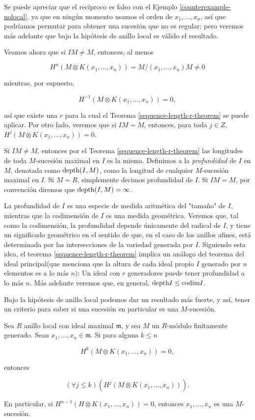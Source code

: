 Se puede apreciar que el recíproco es falso con el Ejemplo \ref{counterexample-nolocal}, ya que en ningún momento usamos el orden de $x_1,\dots, x_n$, así que podríamos permutar para obtener una sucesión que no es regular; pero veremos más adelante que bajo la hipótesis de anillo local es válido el resultado.

Veamos ahora que si $IM \neq M$, entonces, al menos

$$H^n(M\otimes K(x_1,\dots,x_n)) = M/(x_1,\dots,x_n)M \neq 0$$

mientras, por supuesto,

$$ H^{-1}(M\otimes K(x_1,\dots,x_n)) = 0,$$

así que existe una $r$ para la cual el Teorema \ref{sequence-length-r-theorem} se puede aplicar. Por otro lado, veremos que si $IM = M$, entonces, para toda $j \in Z$, $H^j(M\otimes K(x_1,\dots,x_n)) = 0$.

Si $IM \neq M$, entonces por el Teorema \ref{sequence-length-r-theorem} las longitudes de toda $M$-sucesión maximal en $I$ es la misma. Definimos a la \emph{profundidad} de $I$ en $M$, denotada como $\textrm{depth}(I,M)$, como la longitud de cualquier $M$-sucesión maximal en $I$. Si $M = R$, simplemente decimos profundidad de $I$. Si $IM = M$, por convención diremos que $\textrm{depth}(I,M) = \infty$.

La profundidad de $I$ es una especie de medida aritmética del "tamaño" de $I$, mientras que la codimensión de $I$ es una medida geométrica. Veremos que, tal como la codimensión, la profundidad depende únicamente del radical de $I$, y tiene un significado geométrico en el sentido de que, en el caso de los anillos afines, está determinada por las intersecciones de la variedad generada por $I$. Siguiendo esta idea, el teorema \ref{sequence-length-r-theorem} implica un análogo del teorema del ideal principal(que menciona que la altura de cada ideal propio $I$ generado por $n$ elementos es a lo más $n$): Un ideal con $r$ generadores puede tener profundidad a lo más $n$. Más adelante veremos que, en general, $\textrm{depth} I \leq \textrm{codim} I$.

Bajo la hipótesis de anillo local podemos dar un resultado más fuerte, y así, tener un criterio para saber si una sucesión en particular es una $M$-sucesión.

\begin{theorem}\label{sequence-criterion-regular}
Sea $R$ anillo local con ideal maximal $\mathfrak{m}$, y sea $M$ un $R$-módulo finitamente generado. Sean $x_1,\dots,x_n\in\mathfrak{m}$. Si para alguna $k \leq n$

$$ H^k(M \otimes K(x_1,\dots,x_n)) = 0, $$

entonces 

$$ (\forall j \leq k)(H^j(M\otimes K(x_1,\dots,x_n))). $$

En particular, si $H^{n-1}(H\otimes K(x_1,\dots,x_n)) = 0$, entonces $x_1,\dots,x_n$ es una $M$-sucesión.
\end{theorem}

